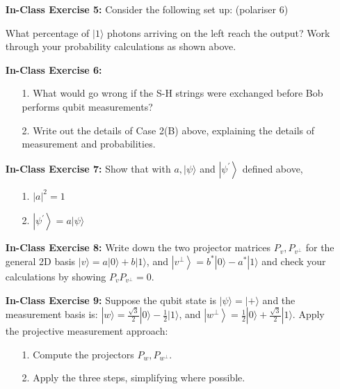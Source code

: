 \documentclass[main.tex]{subfiles}
\begin{document}
\begin{enumerate}
\item[] \textbf{In-Class Exercise 5:} Consider the following set up: (polariser 6)

What percentage of $|1\rangle$ photons arriving on the left reach the output? Work through your probability calculations as shown above.

\item[] \textbf{In-Class Exercise 6:}

    \begin{enumerate}
        \item[1.] What would go wrong if the S-H strings were exchanged before Bob performs qubit measurements?
        \item[2.] Write out the details of Case 2(B) above, explaining the details of measurement and probabilities.
    \end{enumerate}

\item[] \textbf{In-Class Exercise 7:} Show that with $a,|\psi\rangle$ and $\left|\psi^{\prime}\right\rangle$ defined above,

    \begin{enumerate}
        \item[1.] $|a|^{2}=1$
        \item[2.] $\left|\psi^{\prime}\right\rangle=a|\psi\rangle$
        \end{enumerate}

\item[] \textbf{In-Class Exercise 8:} Write down the two projector matrices $P_{v}, P_{v^{\perp}}$ for the general 2D basis $|v\rangle=a|0\rangle+b|1\rangle$, and $\left|v^{\perp}\right\rangle=b^{*}|0\rangle-a^{*}|1\rangle$ and check your calculations by showing $P_{v} P_{v^{\perp}}=0$.

\item[] \textbf{In-Class Exercise 9:} Suppose the qubit state is $|\psi\rangle=|+\rangle$ and the measurement basis is: $|w\rangle=\frac{\sqrt{3}}{2}|0\rangle-\frac{1}{2}|1\rangle$, and $\left|w^{\perp}\right\rangle=\frac{1}{2}|0\rangle+\frac{\sqrt{3}}{2}|1\rangle$. Apply the projective measurement approach:

    \begin{enumerate}
        \item[1.] Compute the projectors $P_{w}, P_{w^{\perp}}$.
        \item[2.] Apply the three steps, simplifying where possible.
    \end{enumerate}
    

\end{enumerate}
\end{document}
